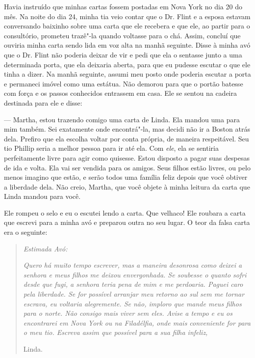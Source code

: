 Havia instruído que minhas cartas
fossem postadas em Nova York no dia 20 do mês. Na noite do dia 24, minha
tia veio contar que o Dr. Flint e a esposa estavam conversando baixinho
sobre uma carta que ele recebera e que ele, ao partir para o
consultório, prometeu trazê"-la quando voltasse para o chá. Assim,
concluí que ouviria minha carta sendo lida em voz alta na manhã
seguinte. Disse à minha avó que o Dr. Flint não poderia deixar de vir e
pedi que ela o sentasse junto a uma determinada porta, que ela deixaria
aberta, para que eu pudesse escutar o que ele tinha a dizer. Na manhã
seguinte, assumi meu posto onde poderia escutar a porta e permaneci
imóvel como uma estátua. Não demorou para que o portão batesse com força
e os passos conhecidos entrassem em casa. Ele se sentou na cadeira
destinada para ele e disse:

--- Martha, estou trazendo comigo uma carta de Linda. Ela mandou uma
para mim também. Sei exatamente onde encontrá"-la, mas decidi não ir a
Boston atrás dela. Prefiro que ela escolha voltar por conta própria, de
maneira respeitável. Seu tio Phillip seria a melhor pessoa para ir até
ela. Com \emph{ele}, ela se sentiria perfeitamente livre para agir como
quisesse. Estou disposto a pagar suas despesas de ida e volta. Ela vai
ser vendida para os amigos. Seus filhos estão livres, ou pelo menos
imagino que estão, e serão todos uma família feliz depois que você
obtiver a liberdade dela. Não creio, Martha, que você objete à minha
leitura da carta que Linda mandou para você.

Ele rompeu o selo e eu o escutei lendo
a carta. Que velhaco! Ele roubara a carta que escrevi para a minha avó e
preparou outra no seu lugar. O teor da falsa carta era o seguinte:

\begin{quote}
\emph{Estimada Avó: }

\emph{Quero há muito tempo escrever, mas a maneira desonrosa como deixei
a senhora e meus filhos me deixou envergonhada. Se soubesse o quanto
sofri desde que fugi, a senhora teria pena de mim e me perdoaria. Paguei
caro pela liberdade. Se for possível arranjar meu retorno ao sul sem me
tornar escrava, eu voltaria alegremente. Se não, imploro que mande meus
filhos para o norte. Não consigo mais viver sem eles. Avise a tempo e eu
os encontrarei em Nova York ou na Filadélfia, onde mais conveniente for
para o meu tio. Escreva assim que possível para a sua filha infeliz,}

Linda.
\end{quote}

